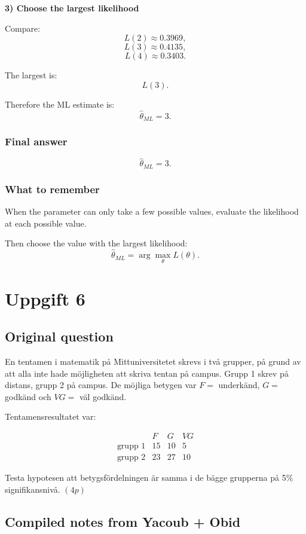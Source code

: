 \documentclass[10pt]{article}
\begin{document}
\textbf{3) Choose the largest likelihood}

Compare:
\[
L(2)\approx 0.3969,
\]
\[
L(3)\approx 0.4135,
\]
\[
L(4)\approx 0.3403.
\]

The largest is:
\[
L(3).
\]

Therefore the ML estimate is:
\[
\hat{\theta}_{ML}=3.
\]

\subsubsection*{Final answer}

\[
\hat{\theta}_{ML}=3.
\]

\subsubsection*{What to remember}

When the parameter can only take a few possible
values, evaluate the likelihood at each possible
value.

Then choose the value with the largest likelihood:
\[
\hat{\theta}_{ML}
=
\arg\max_{\theta} L(\theta).
\]

\section*{Uppgift 6}

\subsection*{Original question}

En tentamen i matematik på Mittuniversitetet skrevs
i två grupper, på grund av att alla inte hade
möjligheten att skriva tentan på campus. Grupp 1
skrev på distans, grupp 2 på campus. De möjliga
betygen var \(F=\) underkänd, \(G=\) godkänd och
\(VG=\) väl godkänd.

Tentamensresultatet var:

\[
\begin{array}{c|ccc}
& F & G & VG\\
\hline
\text{grupp 1} & 15 & 10 & 5\\
\text{grupp 2} & 23 & 27 & 10
\end{array}
\]

Testa hypotesen att betygsfördelningen är samma i de
bägge grupperna på 5\% signifikansnivå. \((4p)\)

\subsection*{Compiled notes from Yacoub + Obid}
\end{document}
